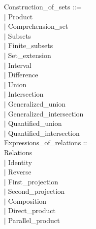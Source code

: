 \documentclass[12pt,a4paper,draft]{report}
\begin{document}
{\begin{sloppypar}
\noindent Construction\_of\_sets ::= \\
\hspace*{0.20in} $|$  Product\\
\hspace*{0.20in} $|$  Comprehension\_set\\
\hspace*{0.20in} $|$  Subsets\\
\hspace*{0.20in} $|$  Finite\_subsets\\
\hspace*{0.20in} $|$  Set\_extension\\
\hspace*{0.20in} $|$  Interval\\
\hspace*{0.20in} $|$  Difference\\
\hspace*{0.20in} $|$  Union\\
\hspace*{0.20in} $|$  Intersection\\
\hspace*{0.20in} $|$  Generalized\_union\\
\hspace*{0.20in} $|$  Generalized\_intersection\\
\hspace*{0.20in} $|$  Quantified\_union\\
\hspace*{0.20in} $|$  Quantified\_intersection\\
Expressions\_of\_relations ::= \\
\hspace*{0.20in}   Relations\\
\hspace*{0.20in} $|$  Identity\\
\hspace*{0.20in} $|$  Reverse\\
\hspace*{0.20in} $|$  First\_projection\\
\hspace*{0.20in} $|$  Second\_projection\\
\hspace*{0.20in} $|$  Composition\\
\hspace*{0.20in} $|$  Direct\_product\\
\hspace*{0.20in} $|$  Parallel\_product\\

\end{sloppypar}}
\end{document}
